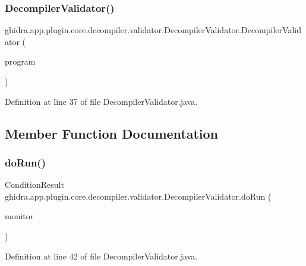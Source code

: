 \subsubsection{\texorpdfstring{DecompilerValidator()}{DecompilerValidator()}}
{\footnotesize\ttfamily ghidra.\+app.\+plugin.\+core.\+decompiler.\+validator.\+Decompiler\+Validator.\+Decompiler\+Validator (\begin{DoxyParamCaption}\item[{Program}]{program }\end{DoxyParamCaption})\hspace{0.3cm}{\ttfamily [inline]}}



Definition at line 37 of file Decompiler\+Validator.\+java.



\subsection{Member Function Documentation}
\mbox{\label{classghidra_1_1app_1_1plugin_1_1core_1_1decompiler_1_1validator_1_1_decompiler_validator_a687a9538377586845a9fc2e230ddf325}} 
\subsubsection{\texorpdfstring{doRun()}{doRun()}}
{\footnotesize\ttfamily Condition\+Result ghidra.\+app.\+plugin.\+core.\+decompiler.\+validator.\+Decompiler\+Validator.\+do\+Run (\begin{DoxyParamCaption}\item[{final Task\+Monitor}]{monitor }\end{DoxyParamCaption})\hspace{0.3cm}{\ttfamily [inline]}}



Definition at line 42 of file Decompiler\+Validator.\+java.

